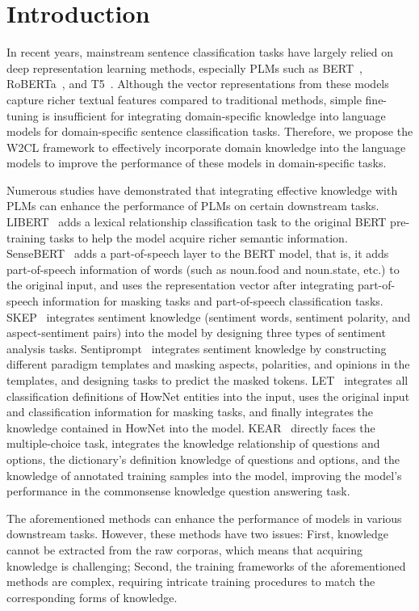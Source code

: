 \section{Introduction}
\label{sec:intro}
In recent years, mainstream sentence classification tasks have largely relied on deep representation learning methods, especially PLMs such as BERT~\cite{bert}, RoBERTa~\cite{roberta}, and T5~\cite{t5}. Although the vector representations from these models capture richer textual features compared to traditional methods, simple fine-tuning is insufficient for integrating domain-specific knowledge into language models for domain-specific sentence classification tasks. Therefore, we propose the W2CL framework to effectively incorporate domain knowledge into the language models to improve the performance of these models in domain-specific tasks.

Numerous studies have demonstrated that integrating effective knowledge with PLMs can enhance the performance of PLMs on certain downstream tasks. LIBERT~\cite{libert} adds a lexical relationship classification task to the original BERT pre-training tasks to help the model acquire richer semantic information. SenseBERT~\cite{sensebert} adds a part-of-speech layer to the BERT model, that is, it adds part-of-speech information of words (such as noun.food and noun.state, etc.) to the original input, and uses the representation vector after integrating part-of-speech information for masking tasks and part-of-speech classification tasks. SKEP~\cite{skep} integrates sentiment knowledge (sentiment words, sentiment polarity, and aspect-sentiment pairs) into the model by designing three types of sentiment analysis tasks. Sentiprompt~\cite{sentiprompt} integrates sentiment knowledge by constructing different paradigm templates and masking aspects, polarities, and opinions in the templates, and designing tasks to predict the masked tokens. LET~\cite{let} integrates all classification definitions of HowNet entities into the input, uses the original input and classification information for masking tasks, and finally integrates the knowledge contained in HowNet into the model. KEAR~\cite{kear} directly faces the multiple-choice task, integrates the knowledge relationship of questions and options, the dictionary’s definition knowledge of questions and options, and the knowledge of annotated training samples into the model, improving the model’s performance in the commonsense knowledge question answering task.

The aforementioned methods can enhance the performance of models in various downstream tasks. However, these methods have two issues: First, knowledge cannot be extracted from the raw corporas, which means that acquiring knowledge is challenging; Second, the training frameworks of the aforementioned methods are complex, requiring intricate training procedures to match the corresponding forms of knowledge.

